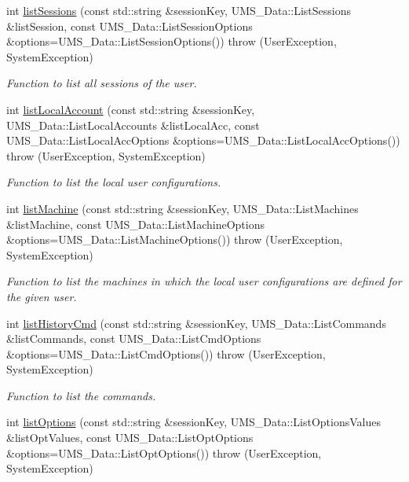 \begin{DoxyCompactItemize}
int \hyperlink{namespacevishnu_adaf9c8ca47f577cf1a0c9effe7bd9c52}{listSessions} (const std::string \&sessionKey, UMS\_\-Data::ListSessions \&listSession, const UMS\_\-Data::ListSessionOptions \&options=UMS\_\-Data::ListSessionOptions())  throw (UserException, SystemException)
\begin{DoxyCompactList}\small\item\em Function to list all sessions of the user. \item\end{DoxyCompactList}\item 
int \hyperlink{namespacevishnu_a05618a81d403ef5c11e014fcecd7ba00}{listLocalAccount} (const std::string \&sessionKey, UMS\_\-Data::ListLocalAccounts \&listLocalAcc, const UMS\_\-Data::ListLocalAccOptions \&options=UMS\_\-Data::ListLocalAccOptions())  throw (UserException, SystemException)
\begin{DoxyCompactList}\small\item\em Function to list the local user configurations. \item\end{DoxyCompactList}\item 
int \hyperlink{namespacevishnu_a59e26ccbe8510d774528c86511f7476b}{listMachine} (const std::string \&sessionKey, UMS\_\-Data::ListMachines \&listMachine, const UMS\_\-Data::ListMachineOptions \&options=UMS\_\-Data::ListMachineOptions())  throw (UserException, SystemException)
\begin{DoxyCompactList}\small\item\em Function to list the machines in which the local user configurations are defined for the given user. \item\end{DoxyCompactList}\item 
int \hyperlink{namespacevishnu_a8576a50af31abe3869a61bec780aa5ef}{listHistoryCmd} (const std::string \&sessionKey, UMS\_\-Data::ListCommands \&listCommands, const UMS\_\-Data::ListCmdOptions \&options=UMS\_\-Data::ListCmdOptions())  throw (UserException, SystemException)
\begin{DoxyCompactList}\small\item\em Function to list the commands. \item\end{DoxyCompactList}\item 
int \hyperlink{namespacevishnu_a53106e021a6e98049b41106c12356e28}{listOptions} (const std::string \&sessionKey, UMS\_\-Data::ListOptionsValues \&listOptValues, const UMS\_\-Data::ListOptOptions \&options=UMS\_\-Data::ListOptOptions())  throw (UserException, SystemException)

\end{DoxyCompactItemize}
